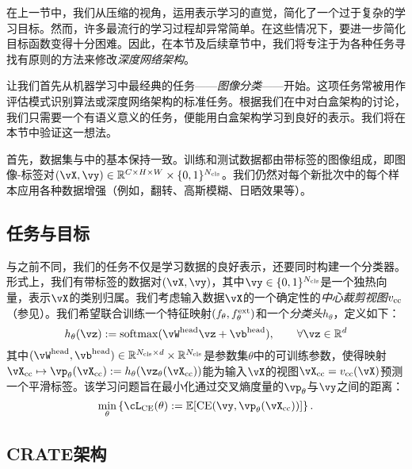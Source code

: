 \documentclass[../../book-main.tex]{subfiles}
\begin{document}
\label{sec:image_classification}

在上一节中，我们从压缩的视角，运用表示学习的直觉，简化了一个过于复杂的学习目标。然而，许多最流行的学习过程却异常简单。在这些情况下，要进一步简化目标函数变得十分困难。因此，在本节及后续章节中，我们将专注于为各种任务寻找有原则的方法来修改\textit{深度网络架构}。

让我们首先从机器学习中最经典的任务——\textit{图像分类}——开始。这项任务常被用作评估模式识别算法或深度网络架构的标准任务。根据我们在中对白盒架构的讨论，我们只需要一个有语义意义的任务，便能用白盒架构学习到良好的表示。我们将在本节中验证这一想法。

首先，数据集与中的基本保持一致。训练和测试数据都由带标签的图像组成，即图像-标签对\((\vX, \vy) \in \R^{C \times H \times W} \times \{0, 1\}^{N_{\cls}}\)。我们仍然对每个新批次中的每个样本应用各种数据增强（例如，翻转、高斯模糊、日晒效果等）。

\subsection{任务与目标} \label{sub:image_classification_objective}

与之前不同，我们的任务不仅是学习数据的良好表示，还要同时构建一个分类器。形式上，我们有带标签的数据对\((\vX, \vy)\)，其中\(\vy \in \{0, 1\}^{N_{\cls}}\)是一个独热向量，表示\(\vX\)的类别归属。我们考虑输入数据\(\vX\)的一个确定性的\textit{中心裁剪视图}\(v_{\mathrm{cc}}\)（参见）。我们希望联合训练一个特征映射\((f_{\theta}, f_{\theta}^{\mathrm{ext}})\)和一个\textit{分类头}\(h_{\theta}\)，定义如下：
\begin{equation}
    h_{\theta}(\vz) := \softmax(\vW^{\head}\vz + \vb^{\head}), \qquad  \forall \vz \in \R^{d}
\end{equation}
其中\((\vW^{\head}, \vb^{\head}) \in \R^{N_{\cls} \times d} \times \R^{N_{\cls}}\)是参数集\(\theta\)中的可训练参数，使得映射\(\vX_{\cc} \mapsto \vp_{\theta}(\vX_{\cc}) := h_{\theta}(\vz_{\theta}(\vX_{\cc}))\)能为输入\(\vX\)的视图\(\vX_{\cc} = v_{\cc}(\vX)\)预测一个平滑标签。该学习问题旨在最小化通过交叉熵度量的\(\vp_{\theta}\)与\(\vy\)之间的距离：
\begin{equation}\label{eq:classification_ce_loss}
    \min_{\theta}\bc{\cL_{\CE}(\theta) := \Ex[\CE(\vy, \vp_{\theta}(\vX_{\cc}))]}.
\end{equation}


\subsection{CRATE架构}\label{sub:image_classification_architecture}
\end{document}
